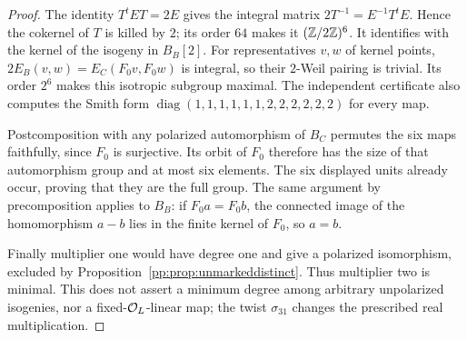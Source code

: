 \begin{proof}
The identity $T^tET=2E$ gives the integral matrix
$2T^{-1}=E^{-1}T^tE$. Hence the cokernel of $T$ is killed by $2$;
its order $64$ makes it $(\mathbb Z/2\mathbb Z)^6$. It identifies with the kernel
of the isogeny in $B_B[2]$. For representatives $v,w$ of kernel points,
$2E_B(v,w)=E_C(F_0v,F_0w)$ is integral, so their $2$-Weil pairing is
trivial. Its order $2^6$ makes this isotropic subgroup maximal.
The independent certificate also computes the Smith form
$\operatorname{diag}(1,1,1,1,1,1,2,2,2,2,2,2)$ for every map.

Postcomposition with any polarized automorphism of $B_C$ permutes the
six maps faithfully, since $F_0$ is surjective. Its orbit of $F_0$
therefore has the size of that automorphism group and at most six
elements. The six displayed units already occur, proving that they
are the full group. The same argument by precomposition applies to
$B_B$: if $F_0a=F_0b$, the connected image of the homomorphism $a-b$
lies in the finite kernel of $F_0$, so $a=b$.

Finally multiplier one would have degree one and give a polarized
isomorphism, excluded by Proposition~\ref{pp:prop:unmarkeddistinct}.
Thus multiplier two is minimal. This does not assert a minimum degree
among arbitrary unpolarized isogenies, nor a fixed-$\mathcal O_L$-linear map;
the twist $\sigma_{31}$ changes the prescribed real multiplication.
\end{proof}

